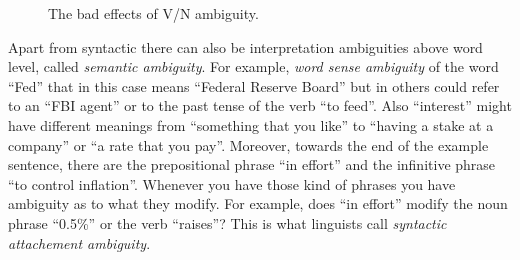 \documentclass[a4paper,10pt]{report}
\begin{document}
\begin{figure}[ht]
\centering
{}\qquad\qquad
{}\qquad\qquad
{}
\caption{The bad effects of V/N ambiguity.}
\label{ambiguity:123}
\end{figure}

Apart from syntactic there can also be interpretation ambiguities above word level, called \emph{semantic ambiguity}. For example, \emph{word sense ambiguity} of the word ``Fed'' that in this case means ``Federal Reserve Board'' but in others could refer to an ``FBI agent'' or to the past tense of the verb ``to feed''. Also ``interest'' might have different meanings from ``something that you like'' to ``having a stake at a company'' or ``a rate that you pay''. Moreover, towards the end of the example sentence, there are the prepositional phrase ``in effort'' and the infinitive phrase ``to control inflation''. Whenever you have those kind of phrases you have ambiguity as to what they modify. For example, does ``in effort'' modify the noun phrase ``0.5\%'' or the verb ``raises''? This is what linguists call \emph{syntactic attachement ambiguity}.
\end{document}
